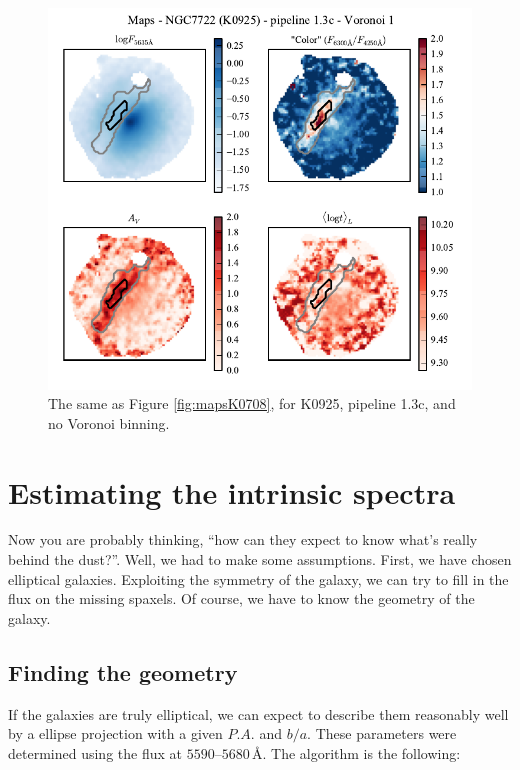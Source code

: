 \documentclass[a4paper]{article}
\newcommand{\angstrom}{\text{\AA}}
\begin{document}
\begin{figure}
\includegraphics{figures/maps_K0925_1.3c_v01.pdf}

\caption{The same as Figure \ref{fig:mapsK0708}, for K0925, pipeline 1.3c, and
no Voronoi binning.}
\label{fig:mapsK0925}
\end{figure}


\section{Estimating the intrinsic spectra}

Now you are probably thinking, ``how can they expect to know what's
really behind the dust?''. Well, we had to make some
assumptions. First, we have chosen elliptical galaxies. Exploiting the
symmetry of the galaxy, we can try to fill in the flux on the missing
spaxels. Of course, we have to know the geometry of the galaxy.

\subsection{Finding the geometry}
\label{sec:geometry}

If the galaxies are truly elliptical, we can expect to describe them reasonably
well by a ellipse projection with a given $P.A.$ and $b/a$. These parameters
were determined using the flux at $5590$--$5680\,\angstrom$. The algorithm is
the following:
\end{document}

